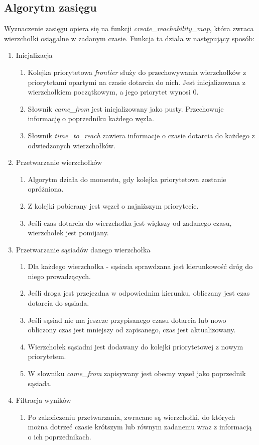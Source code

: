 \documentclass{article}
\begin{document}
\subsection{Algorytm zasięgu}
Wyznaczenie zasięgu opiera się na funkcji \textit{create\_reachability\_map}, która zwraca wierzchołki osiągalne w zadanym czasie. Funkcja ta działa w następujący sposób:
\begin{enumerate}
    \item Inicjalizacja
    \begin{enumerate}
        \item Kolejka priorytetowa \textit{frontier} służy do przechowywania wierzchołków z priorytetami opartymi na czasie dotarcia do nich. Jest inicjalizowana z wierzchołkiem początkowym, a jego priorytet wynosi 0.
        \item Słownik \textit{came\_from} jest inicjalizowany jako pusty. Przechowuje informację o poprzedniku każdego węzła.
        \item Słownik \textit{time\_to\_reach} zawiera informacje o czasie dotarcia do każdego z odwiedzonych wierzchołków. 
    \end{enumerate}
    \item Przetwarzanie wierzchołków
    \begin{enumerate}
        \item Algorytm działa do momentu, gdy kolejka priorytetowa zostanie opróżniona.
        \item Z kolejki pobierany jest węzeł o najniższym priorytecie.
        \item Jeśli czas dotarcia do wierzchołka jest większy od zadanego czasu, wierzchołek jest pomijany.
    \end{enumerate}
    \item Przetwarzanie sąsiadów danego wierzchołka
    \begin{enumerate}
        \item Dla każdego wierzchołka - sąsiada sprawdzana jest kierunkowość dróg do niego prowadzących.
        \item Jeśli droga jest przejezdna w odpowiednim kierunku, obliczany jest czas dotarcia do sąsiada.
        \item Jeśli sąsiad nie ma jeszcze przypisanego czasu dotarcia lub nowo obliczony czas jest mniejszy od zapisanego, czas jest aktualizowany.
        \item Wierzchołek sąsiadni jest dodawany do kolejki priorytetowej z nowym priorytetem.
        \item W słowniku \textit{came\_from} zapisywany jest obecny węzeł jako poprzednik sąsiada.
    \end{enumerate}
    \item Filtracja wyników
    \begin{enumerate}
        \item Po zakończeniu przetwarzania, zwracane są wierzchołki, do których można dotrzeć czasie krótszym lub równym zadanemu wraz z informacją o
        ich poprzednikach.
    \end{enumerate}
\end{enumerate}
\end{document}
